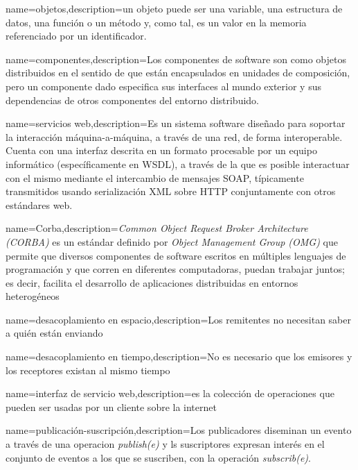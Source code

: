 {name={objetos},description={un objeto puede ser una variable, una estructura de datos, una función o un método y, como tal, es un valor en la memoria referenciado por un identificador.}}

{name={componentes},description={Los componentes de software son como objetos distribuidos en el sentido de que están encapsulados en 	unidades de composición, pero un componente dado especifica sus  interfaces  al 	mundo exterior y sus dependencias de otros componentes del entorno distribuido.}}


{name={servicios web},description={Es un sistema software diseñado para soportar la interacción máquina-a-máquina, a través de una red, de forma interoperable. Cuenta con una interfaz descrita en un formato procesable por un equipo informático (específicamente en WSDL), a través de la que es posible interactuar con el mismo mediante el intercambio de mensajes SOAP, típicamente transmitidos usando serialización XML sobre HTTP conjuntamente con otros estándares web. }}

{name={Corba},description={\textit{Common Object Request Broker Architecture (CORBA)} es un estándar definido por \textit{Object Management Group (OMG)} que permite que diversos componentes de software escritos en múltiples lenguajes de programación y que corren en diferentes computadoras, puedan trabajar juntos; es decir, facilita el desarrollo de aplicaciones distribuidas en entornos heterogéneos }}	

{name={desacoplamiento en espacio},description={Los remitentes no necesitan saber a quién están enviando }}	

{name={desacoplamiento en tiempo},description={No es necesario que los emisores y los receptores existan al mismo tiempo }}	

{name={interfaz de servicio web},description={es la colección de operaciones que pueden ser usadas por un cliente sobre la internet }}	

{name={publicaci\'on-suscripci\'on},description={Los publicadores diseminan un evento a trav\'es de una operacion \textit{publish(e)} y ls suscriptores expresan inter\'es en el conjunto de eventos a los que se suscriben, con la operaci\'on \textit{subscrib(e)}. }}	

